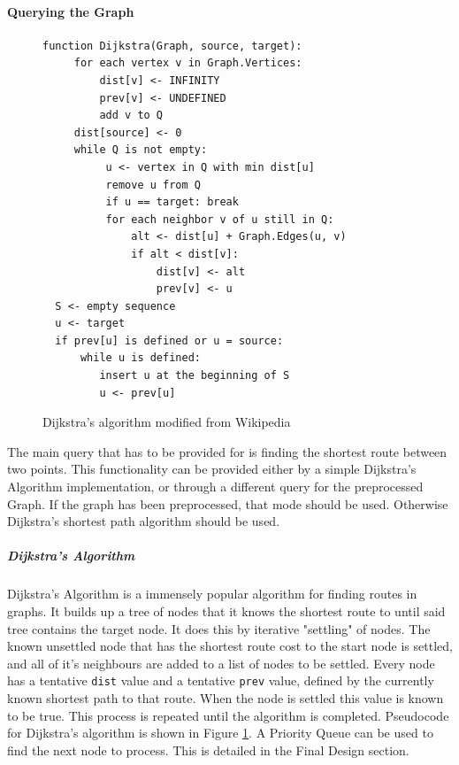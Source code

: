 \documentclass[11pt,twoside,a4paper]{article}
\begin{document}
\paragraph{Querying the Graph}
\begin{figure}[t]
    \begin{center}
\begin{lstlisting}
function Dijkstra(Graph, source, target):
     for each vertex v in Graph.Vertices:            
         dist[v] <- INFINITY                 
         prev[v] <- UNDEFINED                
         add v to Q                     
     dist[source] <- 0                           
     while Q is not empty:
          u <- vertex in Q with min dist[u]   
          remove u from Q
          if u == target: break                                        
          for each neighbor v of u still in Q:
              alt <- dist[u] + Graph.Edges(u, v)
              if alt < dist[v]:              
                  dist[v] <- alt
                  prev[v] <- u
  S <- empty sequence
  u <- target
  if prev[u] is defined or u = source:
      while u is defined:
         insert u at the beginning of S
         u <- prev[u]
\end{lstlisting}
\end{center}
\caption{Dijkstra's algorithm modified from Wikipedia\cite{dijkstrapseudo}}
\label{dijkstrapseudo}
\end{figure}
The main query that has to be provided for is finding the shortest route between two points. This functionality can be provided either by a simple Dijkstra's Algorithm implementation, or through a different query for the preprocessed Graph. If the graph has been preprocessed,
that mode should be used. Otherwise Dijkstra's shortest path algorithm should be used. 
\subparagraph{Dijkstra's Algorithm}
Dijkstra's Algorithm\cite{Dijkstra1959} is a immensely popular algorithm for finding routes in graphs. It builds up a tree of nodes that it knows the shortest route to until said tree contains the target node. It does this by iterative "settling" of nodes.
The known unsettled node that has the shortest route cost to the start node is settled, and all of it's neighbours are added to a list of nodes to be settled. Every node has a tentative \texttt{dist} value and a tentative \texttt{prev} value, defined by the currently known shortest path to that route.
When the node is settled this value is known to be true. This process is repeated until the algorithm is completed. Pseudocode for Dijkstra's algorithm is shown in Figure \ref{dijkstrapseudo}. A Priority Queue can be used to find the next node to process. This is detailed in the Final Design section.
\end{document}
